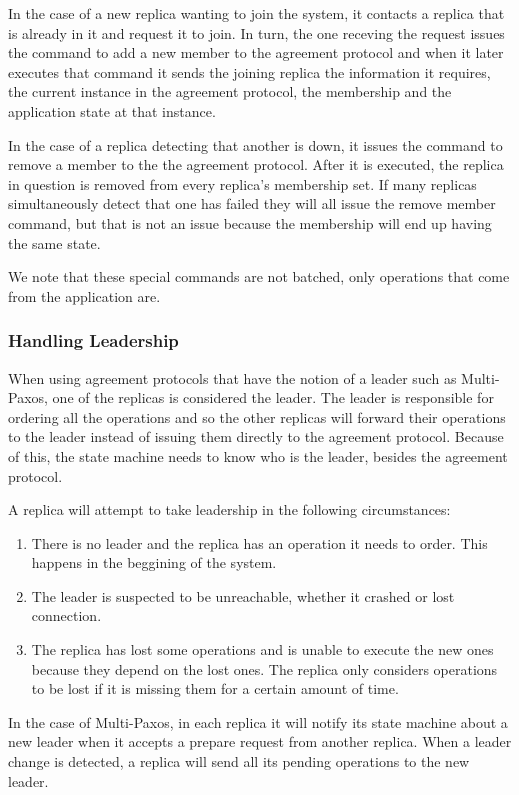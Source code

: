\documentclass[sigconf]{acmart}
\begin{document}
In the case of a new replica wanting to join the system, it contacts a replica that is already in it and request it to join. In turn, the one receving the request issues the command to add a new member to the agreement protocol and when it later executes that command it sends the joining replica the information it requires, the current instance in the agreement protocol, the membership and the application state at that instance.

In the case of a replica detecting that another is down, it issues the command to remove a member to the the agreement protocol. After it is executed, the replica in question is removed from every replica's membership set. If many replicas simultaneously detect that one has failed  they will all issue the remove member command, but that is not an issue because the membership will end up having the same state.  

We note that these special commands are not batched, only operations that come from the application are. 

\subsubsection{Handling Leadership}

When using agreement protocols that have the notion of a leader such as Multi-Paxos, one of the replicas is considered the leader. The leader is responsible for ordering all the operations and so the other replicas will forward their operations to the leader instead of issuing them directly to the agreement protocol. Because of this, the state machine needs to know who is the leader, besides the agreement protocol.

A replica will attempt to take leadership in the following circumstances:
\begin{enumerate}
\item There is no leader and the replica has an operation it needs to order. This happens in the beggining of the system.
\item The leader is suspected to be unreachable, whether it crashed or lost connection.
\item The replica has lost some operations and is unable to execute the new ones because they depend on the lost ones. The replica only considers operations to be lost if it is missing them for a certain amount of time.
\end{enumerate}

In the case of Multi-Paxos, in each replica it will notify its state machine about a new leader when it accepts a prepare request from another replica. When a leader change is detected, a replica will send all its pending operations to the new leader.
\end{document}
